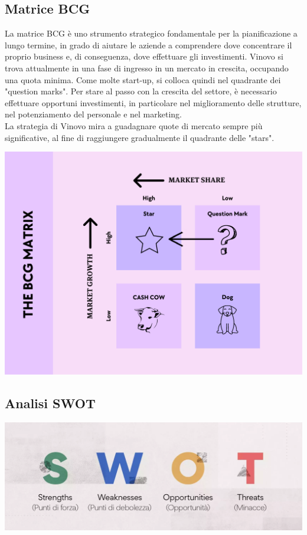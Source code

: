 \documentclass[12pt, a4paper]{article}
\newcommand{\meskip}{\medskip \\}
\begin{document}
\subsection{Matrice BCG}
La matrice BCG è uno strumento strategico fondamentale per la pianificazione a lungo termine, in grado di aiutare le aziende a comprendere dove concentrare il proprio business e, di conseguenza, dove effettuare gli investimenti. Vinovo si trova attualmente in una fase di ingresso in un mercato in crescita, occupando una quota minima. Come molte start-up, si colloca quindi nel quadrante dei "question marks". Per stare al passo con la crescita del settore, è necessario effettuare opportuni investimenti, in particolare nel miglioramento delle strutture, nel potenziamento del personale e nel marketing.\meskip
La strategia di Vinovo mira a guadagnare quote di mercato sempre più significative, al fine di raggiungere gradualmente il quadrante delle "stars".
\begin{center}
    \includegraphics[width=.85\textwidth]{images/bcg_matrix.png}
\end{center}


\subsection{Analisi SWOT}
\begin{center}
    \includegraphics[width=\textwidth]{images/swot.png}
\end{center}
\end{document}
